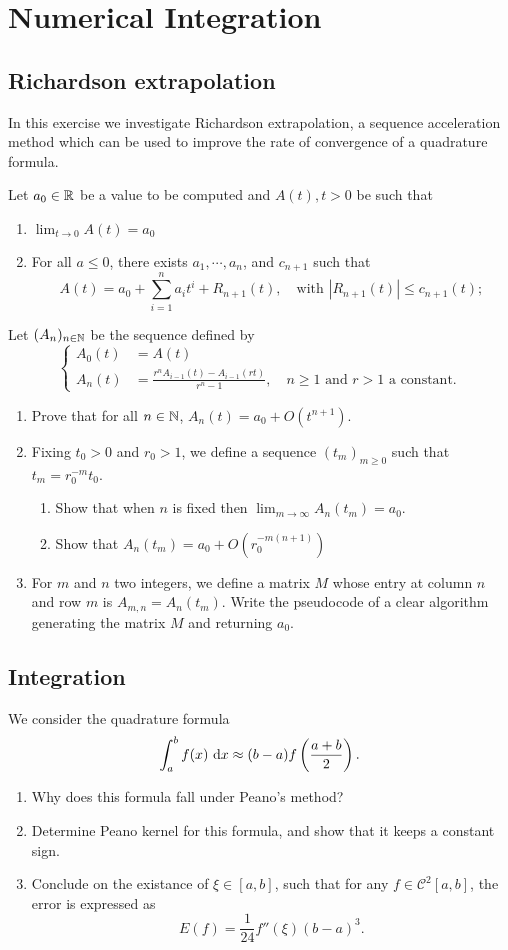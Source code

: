 \chapter{Numerical Integration}

\section{Richardson extrapolation}
In this exercise we investigate Richardson extrapolation, a sequence acceleration method which can be used to improve the rate of convergence of a quadrature formula.

Let \(a_0\in\mathbb{R}\) be a value to be computed and \(A(t), t > 0\) be such that
\begin{enumerate}
	\item \(\lim_{t\to0}A(t)=a_0\)
	\item For all \(a\leq0\), there exists \(a_1,\cdots,a_n\), and \(c_{n+1}\) such that
	\[ A(t)=a_0+\sum_{i=1}^{n}a_i t^i+R_{n+1}(t),\quad\text{with } |R_{n+1}(t)|\leq c_{n+1}(t);  \]
\end{enumerate}
Let \((A_n)_{n\in\mathbb{N}}\) be the sequence defined by
\[ \begin{cases} A_0(t)&= A(t) \\ A_n(t)&=\frac{r^nA_{i-1}(t)-A_{i-1}(rt)}{r^n-1},\quad n\geq1 \text{ and } r>1 \text{ a constant.} \end{cases} \]
\begin{enumerate}
	\item Prove that for all \(n\in\mathbb{N}\), \(A_n(t)= a_0 + O(t^{n+1})\).
	\item Fixing \(t_0 > 0\) and \(r_0 > 1\), we define a sequence \((t_m)_{m\geq0}\) such that \(t_m = r_0^{-m} t_0\).
	\begin{enumerate}
		\item Show that when $n$ is fixed then \(\lim_{m\to\infty}A_n(t_m)=a_0\).
		\item Show that \(A_n(t_m)=a_0+O(r_0^{-m(n+1)}) \)
	\end{enumerate}
	\item For $m$ and $n$ two integers, we define a matrix $M$ whose entry at column $n$ and row $m$ is \(A_{m,n}=A_n(t_m)\).
	Write the pseudocode of a clear algorithm generating the matrix $M$ and returning $a_0$.
\end{enumerate}

\section{Integration}
We consider the quadrature formula
\[ \int_a^b f(x)~\mathrm{d} x\approx(b-a)f\left(\frac{a+b}{2}\right). \]
\begin{enumerate}
	\item Why does this formula fall under Peano's method?
	\item Determine Peano kernel for this formula, and show that it keeps a constant sign.
	\item Conclude on the existance of \(\xi\in[a,b]\), such that for any \(f\in\mathcal{C}^2[a,b]\), the error is expressed as
	\[ E(f)=\frac{1}{24}f''(\xi)(b-a)^3. \]
\end{enumerate}


